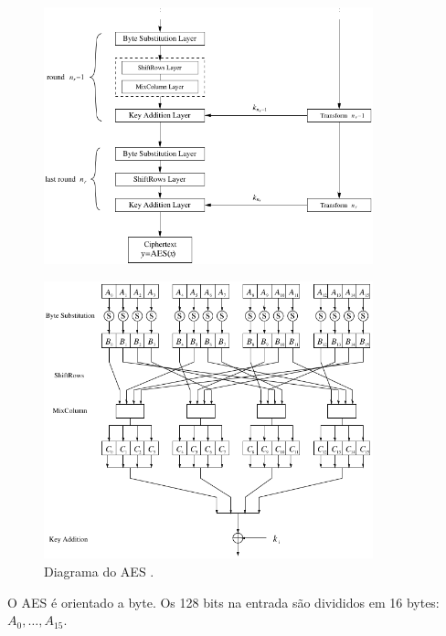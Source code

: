 \begin{frame}[allowframebreaks]
\begin{figure}[h]
\centering
\includegraphics[width=0.85\textwidth,height=0.7\textheight,keepaspectratio]{figures/AES-diagrama-z2.png}
\label{fig-AES-diagrama-z2}
\end{figure}


 \framebreak

\begin{figure}[h]
\centering
\includegraphics[width=0.85\textwidth,height=0.65\textheight,keepaspectratio]{figures/AES-roundfunction.png}
\caption{Diagrama do AES \cite{paar2014}.}
\label{fig-AES-roundfunction}
\end{figure}

O AES é orientado a byte. Os 128 bits na entrada são divididos em 16 bytes: $A_0, \ldots, A_{15}$.


\end{frame}
